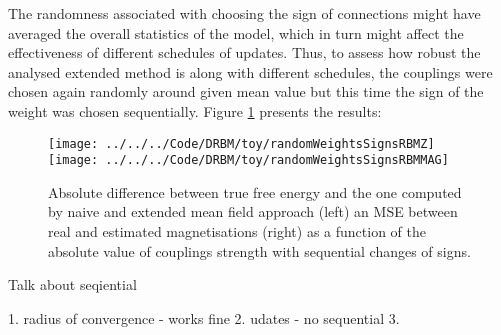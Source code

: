 \documentclass[../report/report.tex]{subfiles}
\begin{document}
The randomness associated with choosing the sign of connections might have averaged the overall statistics of the model, which in turn might affect the effectiveness of different schedules of updates. Thus, to assess how robust the analysed extended method is along with different schedules, the couplings were chosen again randomly around given mean value but this time the sign of the weight was chosen sequentially.
Figure \ref{fig:gridModelSigns} presents the results:
\begin{figure}[!htb]
%
 \texttt{[image: ../../../Code/DRBM/toy/randomWeightsSignsRBMZ]}
\endminipage 
{}  
 \texttt{[image: ../../../Code/DRBM/toy/randomWeightsSignsRBMMAG]}
\endminipage\hfill
  \caption[1]{Absolute difference between true free energy and the one computed by naive and extended mean field approach (left) an MSE between real and estimated magnetisations (right) as a function of the absolute value of couplings strength with sequential changes of signs.}
  \label{fig:gridModelSigns}
\end{figure}

Talk about seqiential

1. radius of convergence - works fine
2. udates - no sequential
3.
\end{document}
